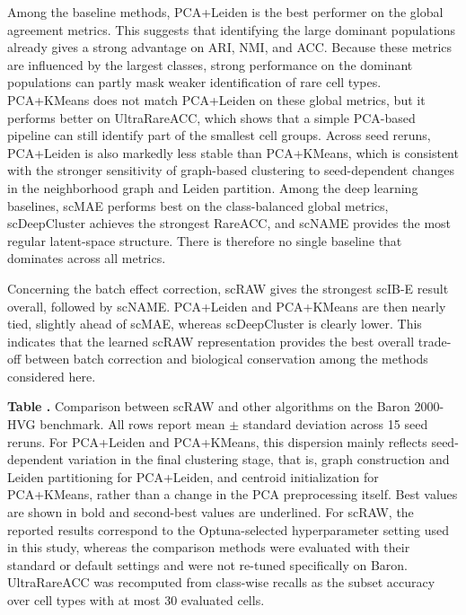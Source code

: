 \documentclass[11pt,a4paper]{article}
\begin{document}
Among the baseline methods, PCA+Leiden is the best performer on
the global agreement metrics. This suggests
that identifying the large dominant populations already gives a
strong advantage on ARI, NMI, and ACC. Because these metrics are influenced by the largest classes, strong performance on the dominant populations can partly mask weaker identification of rare cell types. PCA+KMeans does not match
PCA+Leiden on these global metrics, but it performs better on
UltraRareACC, which shows that a simple PCA-based pipeline can still
identify part of the smallest cell groups. Across seed reruns, PCA+Leiden is also markedly less stable than PCA+KMeans, which is consistent with the stronger sensitivity of graph-based clustering to seed-dependent changes in the neighborhood graph and Leiden partition. Among the deep learning baselines, scMAE performs best on the class-balanced global metrics,
scDeepCluster achieves the strongest RareACC, and scNAME provides the most
regular latent-space structure. There is therefore
no single baseline that dominates across all metrics.

Concerning the batch effect correction, scRAW gives the strongest scIB-E result overall, followed by scNAME. PCA+Leiden and PCA+KMeans are then nearly tied, slightly ahead of scMAE, whereas scDeepCluster is clearly lower. This indicates that the learned scRAW representation provides the best overall trade-off between batch correction and biological conservation among the methods considered here.

\vspace{\baselineskip}
\noindent\textbf{Table \thetable.}
Comparison between scRAW and other algorithms on the Baron 2000-HVG benchmark. All rows report mean $\pm$ standard deviation across 15 seed reruns. For PCA+Leiden and PCA+KMeans, this dispersion mainly reflects seed-dependent variation in the final clustering stage, that is, graph construction and Leiden partitioning for PCA+Leiden, and centroid initialization for PCA+KMeans, rather than a change in the PCA preprocessing itself. Best values are shown in bold and second-best values are underlined. For scRAW, the reported results correspond to the Optuna-selected hyperparameter setting used in this study, whereas the comparison methods were evaluated with their standard or default settings and were not re-tuned specifically on Baron. UltraRareACC was recomputed from class-wise recalls as the subset accuracy over cell types with at most 30 evaluated cells.
\label{tab:benchmark_compare}
\end{document}
